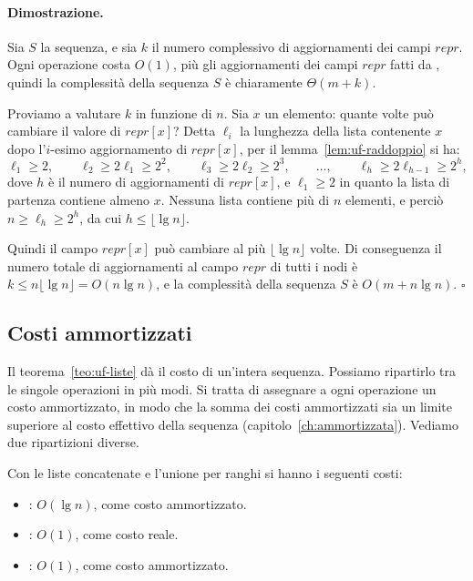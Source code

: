 \paragraph{Dimostrazione.}
Sia $S$ la sequenza, e sia $k$ il numero complessivo di aggiornamenti dei campi $\mathit{repr}$. Ogni operazione costa $O(1)$, più gli aggiornamenti dei campi $\mathit{repr}$ fatti da \Union{}, quindi la complessità della sequenza $S$ è chiaramente $\Theta(m + k)$.

Proviamo a valutare $k$ in funzione di $n$. Sia $x$ un elemento: quante volte può cambiare il valore di $\mathit{repr}[x]$? Detta $\ell_i$ la lunghezza della lista contenente $x$ dopo l'$i$-esimo aggiornamento di $\mathit{repr}[x]$, per il lemma~\ref{lem:uf-raddoppio} si ha:
\[
\ell_1 \ge 2, \qquad \ell_2 \ge 2\ell_1 \ge 2^2, \qquad \ell_3 \ge 2\ell_2 \ge 2^3, \qquad \ldots, \qquad \ell_h \ge 2\ell_{h-1} \ge 2^h,
\]
dove $h$ è il numero di aggiornamenti di $\mathit{repr}[x]$, e $\ell_1 \ge 2$ in quanto la lista di partenza contiene almeno $x$. Nessuna lista contiene più di $n$ elementi, e perciò $n \ge \ell_h \ge 2^h$, da cui $h \le \lfloor \lg n \rfloor$.

Quindi il campo $\mathit{repr}[x]$ può cambiare al più $\lfloor \lg n \rfloor$ volte. Di conseguenza il numero totale di aggiornamenti al campo $\mathit{repr}$ di tutti i nodi è $k \le n \lfloor \lg n \rfloor = O(n \lg n)$, e la complessità della sequenza $S$ è $O(m + n \lg n)$. \hfill $\square$

\subsection{Costi ammortizzati}\label{sec:uf-liste-ammortizzati}
Il teorema~\ref{teo:uf-liste} dà il costo di un'intera sequenza. Possiamo ripartirlo tra le singole operazioni in più modi. Si tratta di assegnare a ogni operazione un costo ammortizzato, in modo che la somma dei costi ammortizzati sia un limite superiore al costo effettivo della sequenza (capitolo~\ref{ch:ammortizzata}). Vediamo due ripartizioni diverse.

\begin{teorema}\label{teo:uf-prima}
Con le liste concatenate e l'unione per ranghi si hanno i seguenti costi:
\begin{itemize}
    \item \MakeSet{}: $O(\lg n)$, come costo ammortizzato.
    \item \FindSet{}: $O(1)$, come costo reale.
    \item \Union{}: $O(1)$, come costo ammortizzato.
\end{itemize}
\end{teorema}

